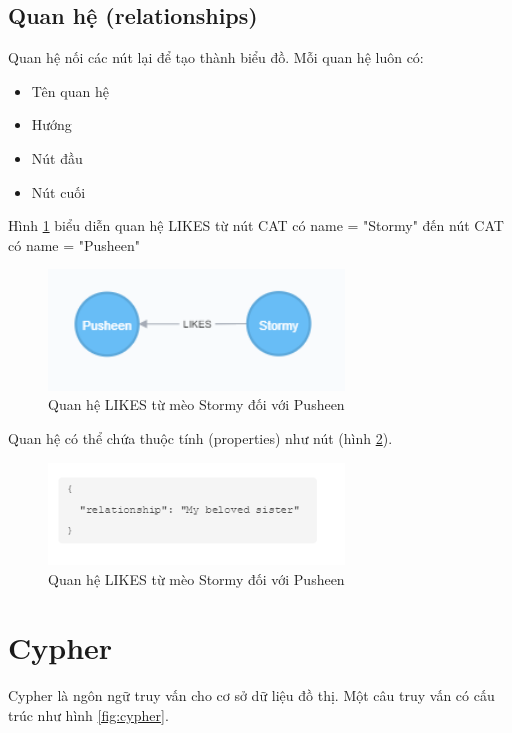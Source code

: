 \subsection{Quan hệ (relationships)}
Quan hệ nối các nút lại để tạo thành biểu đồ. Mỗi quan hệ luôn có: 

\begin{itemize}
\item Tên quan hệ
\item Hướng 
\item Nút đầu
\item Nút cuối
\end{itemize}

Hình \ref{fig:relationships} biểu diễn quan hệ LIKES từ nút CAT có name = "Stormy" đến nút CAT có name = "Pusheen"

\begin{figure}[h]
\centering
\includegraphics[width=0.7\textwidth]{image/relationships.PNG}
\caption{\label{fig:relationships} Quan hệ LIKES từ mèo Stormy đối với Pusheen}
\end{figure}

Quan hệ có thể chứa thuộc tính (properties) như nút (hình \ref{fig:relationshipsprop}). 

\begin{figure}[h]
\centering
\includegraphics[width=0.7\textwidth]{image/quan_he_thuoc_tin.PNG}
\caption{\label{fig:relationshipsprop} Quan hệ LIKES từ mèo Stormy đối với Pusheen}
\end{figure}

\section{Cypher}

Cypher là ngôn ngữ truy vấn cho cơ sở dữ liệu đồ thị. Một câu truy vấn có cấu trúc như hình \ref{fig:cypher}.

